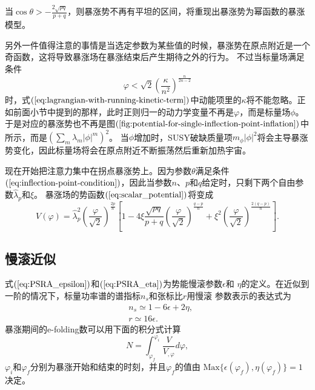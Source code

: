 当$\cos\theta > -
\frac{2\sqrt{pq}}{p+q}$，则暴涨势不再有平坦的区间，将重现出暴涨势为幂函数的暴涨模型。

另外一件值得注意的事情是当选定参数为某些值的时候，暴涨势在原点附近是一个奇函数，这将导致暴涨场在暴涨结束后产生期待之外的行为。
不过当标量场满足条件
\begin{equation}
  \varphi < \sqrt{2} {\left(\frac{\kappa}{n^2}\right)}^{\frac{n}{2n-2}}
\end{equation}
时，式$(\ref{eq:lagrangian-with-running-kinetic-term})$中动能项里的$\kappa$将不能忽略。正如前面小节中提到的那样，此时正则归一的动力学变量不再是$\varphi$，而是标量场$\phi$。于是对应的暴涨势也不再是图$(\ref{fig:potential-for-single-inflection-point-inflation})$中所示，而是${\left(\sum_m
\lambda_m \left\lvert \phi \right\rvert^{m}\right)}^2$。
当$\phi$增加时，SUSY破缺质量项$m_{\phi}\left\lvert \phi\right\rvert
^2$将会主导暴涨势变化\citep{nakayama2010running}，因此标量场将会在原点附近不断振荡然后重新加热宇宙。

现在开始把注意力集中在拐点暴涨势上。因为参数$\theta$满足条件$(\ref{eq:inflection-point-condition})$，因此当参数$n$、$p$和$q$给定时，只剩下两个自由参数$\hat{\lambda}_{p}$和$\xi$。
暴涨场的势函数$(\ref{eq:scalar_potential})$将变成
\begin{equation}
  \label{eq:inflection-poin-potential}
  V(\varphi) = \hat{\lambda}^2_{p}
  {\left(\frac{\varphi}{\sqrt{2}}\right)}^{\frac{2p}{n}} 
  \left[ 1-4\xi \frac{\sqrt{pq}}{p+q}
  {\left(\frac{\varphi}{\sqrt{2}}\right)}^{\frac{q-p}{n}} + \xi^2 
{\left(\frac{\varphi}{\sqrt{2}}\right)}^{\frac{2(q-p)}{n}}\right].
\end{equation}

\subsection{慢滚近似}
式$(\ref{eq:PSRA_epsilon})$和$(\ref{eq:PSRA_eta})$为势能慢滚参数$\epsilon$和
$\eta$的定义。在近似到一阶的情况下，标量功率谱的谱指标$n_{s}$和张标比$r$用慢滚
参数表示的表达式为
\begin{align}
  \label{eq:ns-in-slow-roll-parameter}
  & n_{s} \simeq 1 - 6\epsilon + 2\eta, \\
  \label{eq:eta-in-slow-roll-parameter}
  & r \simeq 16\epsilon.
\end{align}
暴涨期间的e-folding数可以用下面的积分式计算
\begin{equation}
  \label{eq:e-folding-number-with-potential-integral}
  N = \int_{\varphi_{f}}^{\varphi_{i}} \frac{V}{V_{,\varphi}} d\varphi, 
\end{equation}
$\varphi_{i}$和$\varphi_{f}$分别为暴涨开始和结束的时刻，并且$\varphi_{f}$的值由
$\text{Max} \{\epsilon(\varphi_{f}), \eta(\varphi_{f})\}=1$决定。

